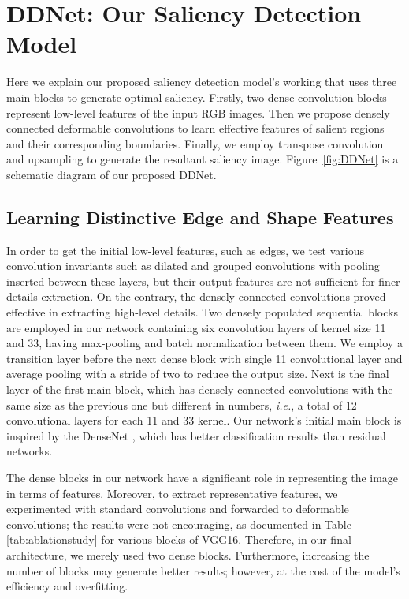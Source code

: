 \documentclass{article}
\newcommand{\latinphrase}[1]{\textit{#1}}
\newcommand{\ie}{\latinphrase{i.e.}\xspace}
\begin{document}
\section{DDNet: Our Saliency Detection Model}
\label{DDNet}
Here we explain our proposed saliency detection model's working that uses three main blocks to generate optimal saliency. Firstly, two dense convolution blocks represent low-level features of the input RGB images. Then we propose densely connected deformable convolutions to learn effective features of salient regions and their corresponding boundaries. Finally, we employ transpose convolution and upsampling to generate the resultant saliency image. Figure~\ref{fig:DDNet} is a schematic diagram of our proposed DDNet.

\subsection{Learning Distinctive Edge and Shape Features}
In order to get the initial low-level features, such as edges, we test various convolution invariants such as dilated and grouped convolutions with pooling inserted between these layers, but their output features are not sufficient for finer details extraction. On the contrary, the densely connected convolutions proved effective in extracting high-level details. Two densely populated sequential blocks are employed in our network containing six convolution layers of kernel size 11 and 33, having max-pooling and batch normalization between them. We employ a transition layer before the next dense block with single 11 convolutional layer and average pooling with a stride of two to reduce the output size. Next is the final layer of the first main block, which has densely connected convolutions with the same size as the previous one but different in numbers, \ie, a total of 12 convolutional layers for each 11 and 33 kernel. Our network's initial main block is inspired by the DenseNet  \cite{huang2017densely}, which has better classification results than residual networks.

The dense blocks in our network have a significant role in representing the image in terms of features. Moreover, to extract representative features, we experimented with standard convolutions and forwarded to deformable convolutions; the results were not encouraging, as documented in Table \ref{tab:ablationstudy} for various blocks of VGG16. Therefore, in our final architecture, we merely used two dense blocks. Furthermore, increasing the number of blocks may generate better results; however, at the cost of the model's efficiency and overfitting.
\end{document}
